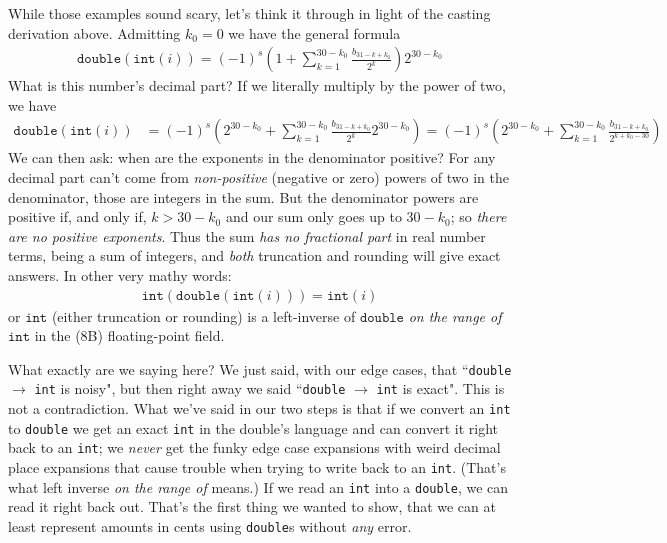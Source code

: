 \documentclass[11pt, oneside]{amsart}   	%
\begin{document}
While those examples sound scary, let's think it through in light of the casting derivation above. Admitting $k_0 = 0$ we have the general formula
\begin{align*}
    \texttt{double}(\texttt{int}(i)) 
        = (-1)^{s}\left( 1 + \sum_{k=1}^{30-k_0} \frac{b_{31-k+k_0}}{2^{k}} \right) 2^{30-k_0}
\end{align*}
What is this number's decimal part? If we literally multiply by the power of two, we have
\begin{align*}
    \texttt{double}(\texttt{int}(i)) 
        &= (-1)^{s}\left( 2^{30-k_0} + \sum_{k=1}^{30-k_0} \frac{b_{31-k+k_0}}{2^{k}} 2^{30-k_0} \right)
        = (-1)^{s}\left( 2^{30-k_0} + \sum_{k=1}^{30-k_0} \frac{b_{31-k+k_0}}{2^{k+k_0-30}} \right)
\end{align*}
We can then ask: when are the exponents in the denominator positive? For any decimal part can't come from {\em non-positive} (negative or zero) powers of two in the denominator, those are integers in the sum. But the denominator powers are positive if, and only if, $k > 30-k_0$ and our sum only goes up to $30-k_0$; so {\em there are no positive exponents}. Thus the sum {\em has no fractional part} in real number terms, being a sum of integers, and {\em both} truncation and rounding will give exact answers. In other very mathy words:
\begin{align*}
    \texttt{int}(\texttt{double}(\texttt{int}(i))) = \texttt{int}(i)
\end{align*}
or $\texttt{int}$ (either truncation or rounding) is a left-inverse of $\texttt{double}$ {\em on the range of} $\texttt{int}$ in the (8B) floating-point field. 

What exactly are we saying here? We just said, with our edge cases, that ``\texttt{double} $\to$ \texttt{int} is noisy", but then right away we said ``\texttt{double} $\to$ \texttt{int} is exact". This is not a contradiction. What we've said in our two steps is that if we convert an \texttt{int} to \texttt{double} we get an exact \texttt{int} in the double's language and can convert it right back to an \texttt{int}; we {\em never} get the funky edge case expansions with weird decimal place expansions that cause trouble when trying to write back to an \texttt{int}. (That's what left inverse {\em on the range of} means.) If we read an \texttt{int} into a \texttt{double}, we can read it right back out. That's the first thing we wanted to show, that we can at least represent amounts in cents using \texttt{double}s without {\em any} error. 
\end{document}
